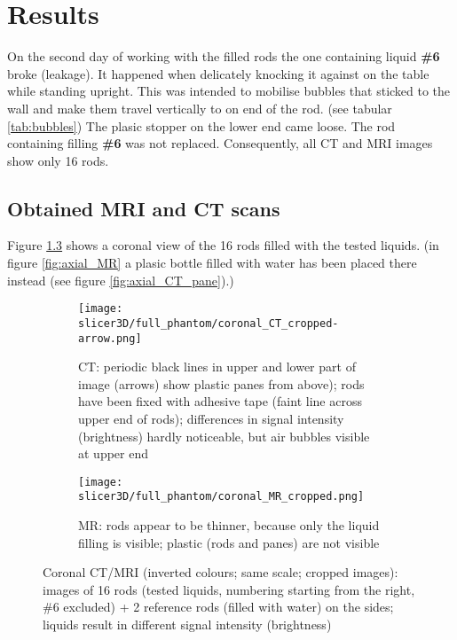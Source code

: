 

\chapter{Results}

On the second day of working with the filled rods the one containing liquid \textbf{\#6} broke (leakage).
It happened when delicately knocking it against on the table while standing upright.
This was intended to mobilise bubbles that sticked to the wall and make them travel vertically to on end of the rod. (see tabular \ref{tab:bubbles})
The plasic stopper on the lower end came loose.
The rod containing filling \textbf{\#6} was not replaced.
Consequently, all CT and MRI images show only 16 rods.

\section{Obtained MRI and CT scans}
Figure \ref{fig:coronal} shows a coronal view of the 16 rods filled with the tested liquids.
(in figure \ref{fig:axial_MR} a plasic bottle filled with water has been placed there instead (see figure \ref{fig:axial_CT_pane}).)
 
\begin{figure}[!tbp]
  \begin{subfigure}[b]{\textwidth}
    \texttt{[image: slicer3D/full\_phantom/coronal\_CT\_cropped-arrow.png]}
    \caption{CT: periodic black lines in upper and lower part of image (arrows) show plastic panes from above); rods have been fixed with adhesive tape (faint line across upper end of rods); differences in signal intensity (brightness) hardly noticeable, but air bubbles visible at upper end}
    \label{fig:coronal_CT}
  \end{subfigure}
  \begin{subfigure}[b]{1\textwidth}
    \texttt{[image: slicer3D/full\_phantom/coronal\_MR\_cropped.png]}
    \caption{MR: rods appear to be thinner, because only the liquid filling is visible; plastic (rods and panes) are not visible}
    \label{fig:coronal_MR}
  \end{subfigure}
  \caption{Coronal CT/MRI (inverted colours; same scale; cropped images): images of 16 rods (tested liquids, numbering starting from the right, \#6 excluded) + 2 reference rods (filled with water) on the sides; liquids result in different signal intensity (brightness)}
  \label{fig:coronal}
\end{figure}

